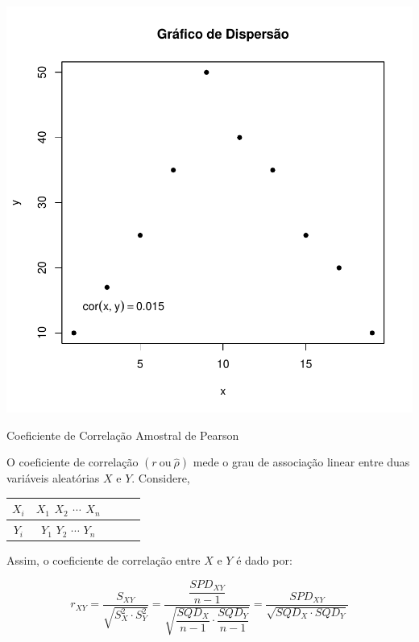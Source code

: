 \documentclass[14pt,aspectratio=1610]{beamer}
\begin{document}
\begin{frame}[fragile]{}
\begin{center}
\includegraphics{Aula10-006}
\end{center}
\end{frame}

\begin{frame}{Coeficiente de Correlação Amostral de Pearson}
    \begin{block}{}
    \justifying
    O coeficiente de correlação $(r\ \textrm{ou}\ \hat{\rho})$ mede o grau de associação linear entre duas variáveis aleatórias $X$ e $Y.$ Considere,
    \begin{table}[H]
        \centering
        \begin{tabular}{c|cccc}
             $X_{i}$&$X_{1}$ $X_{2}$ $\cdots$ $X_{n}$ \\
             \hline
             $Y_{i}$&$Y_{1}$ $Y_{2}$ $\cdots$ $Y_{n}$ 
        \end{tabular}
    \end{table}
    Assim, o coeficiente de correlação entre $X$ e $Y$ é dado por:
    
    $$r_{XY}=\dfrac{S_{XY}}{\sqrt{S^{2}_{X}\cdot S_{Y}^{2}}}=
    \dfrac{\dfrac{SPD_{XY}}{n-1}}{\sqrt{\dfrac{SQD_{X}}{n-1}\cdot\dfrac{SQD_{Y}}{n-1}}}= 
    \dfrac{SPD_{XY}}{\sqrt{SQD_{X}\cdot SQD_{Y}}}$$
    
    \end{block}
\end{frame}
\end{document}
